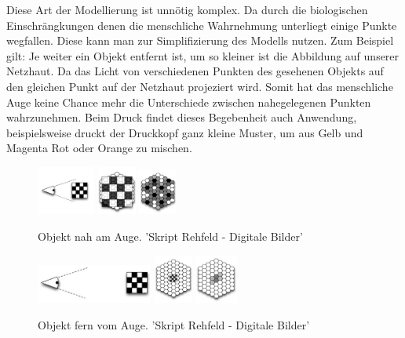 \documentclass[tog]{acmsiggraph}
\begin{document}
Diese Art der Modellierung ist unnötig komplex. Da durch die biologischen Einschrängkungen denen die menschliche Wahrnehmung unterliegt einige Punkte wegfallen. Diese kann man zur Simplifizierung des Modells nutzen.
Zum Beispiel gilt: Je weiter ein Objekt entfernt ist, um so kleiner ist die Abbildung auf unserer Netzhaut. Da das Licht von verschiedenen Punkten des gesehenen Objekts auf den gleichen Punkt auf der Netzhaut projeziert wird. Somit hat das menschliche Auge keine Chance mehr die Unterschiede zwischen nahegelegenen Punkten wahrzunehmen.
Beim Druck findet dieses Begebenheit auch Anwendung, beispielsweise druckt der Druckkopf ganz kleine Muster, um aus Gelb und Magenta Rot oder Orange zu mischen.


\begin{figure}[ht]
  \centering
  \includegraphics[width=0.75in]{images/AugeObjektNah}
  \includegraphics[width=0.5in]{images/SinneszelleObjektNah}
  \includegraphics[width=0.5in]{images/AbbildungAufSinneszelleObjektNah}
  \caption{Objekt nah am Auge. 'Skript Rehfeld - Digitale Bilder'}
  \label{fig:Objekt nah am Auge}
\end{figure}

\begin{figure}[ht]
  \centering
  \includegraphics[width=1.5in]{images/AugeObjektFern}
  \includegraphics[width=0.5in]{images/SinneszelleObjektFern}
  \includegraphics[width=0.55in]{images/AbbildungAufSinneszelleObjektFern}
  \caption{Objekt fern vom Auge. 'Skript Rehfeld - Digitale Bilder'}
  \label{fig:Objekt fern vom Auge}
\end{figure}
\end{document}
